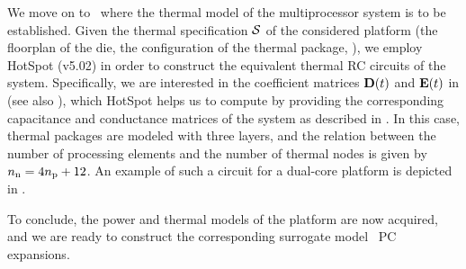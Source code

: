 We move on to \ where the thermal model of the multiprocessor system is to be established.
Given the thermal specification $\mathcal{S}$ of the considered platform (the floorplan of the die, the configuration of the thermal package, \etc), we employ HotSpot (v5.02) \cite{hotspot} in order to construct the equivalent thermal RC circuits of the system.
Specifically, we are interested in the coefficient matrices $\mCF(\t)$ and $\mCS(\t)$ in  (see also ), which HotSpot helps us to compute by providing the corresponding capacitance and conductance matrices of the system as described in .
In this case, thermal packages are modeled with three layers, and the relation between the number of processing elements and the number of thermal nodes is given by ${n_\text{n}} = 4 {n_\text{p}} + 12$.
An example of such a circuit for a dual-core platform is depicted in .

To conclude, the power and thermal models of the platform are now acquired, and we are ready to construct the corresponding surrogate model \via\ PC expansions.
